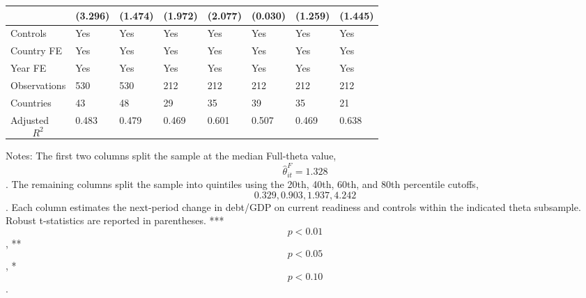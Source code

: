 \begin{table}[H]
\begin{threeparttable}
\begin{tabularx}{\textwidth}{lYYYYYYY}
  & (3.296) & (1.474) & (1.972) & (2.077) & (0.030) & (1.259) & (1.445) \\
\midrule
Controls & Yes & Yes & Yes & Yes & Yes & Yes & Yes \\
Country FE & Yes & Yes & Yes & Yes & Yes & Yes & Yes \\
Year FE & Yes & Yes & Yes & Yes & Yes & Yes & Yes \\
Observations & 530 & 530 & 212 & 212 & 212 & 212 & 212 \\
Countries & 43 & 48 & 29 & 35 & 39 & 35 & 21 \\
Adjusted $$R^2$$ & 0.483 & 0.479 & 0.469 & 0.601 & 0.507 & 0.469 & 0.638 \\
\bottomrule
\end{tabularx}
\begin{tablenotes}[flushleft]\footnotesize
\item Notes: The first two columns split the sample at the median Full-theta value, $$\widehat{\theta}^{F}_{it}=1.328$$. The remaining columns split the sample into quintiles using the 20th, 40th, 60th, and 80th percentile cutoffs, $$0.329, 0.903, 1.937, 4.242$$. Each column estimates the next-period change in debt/GDP on current readiness and controls within the indicated theta subsample. Robust t-statistics are reported in parentheses. *** $$p<0.01$$, ** $$p<0.05$$, * $$p<0.10$$.
\end{tablenotes}
\end{threeparttable}
\end{table}
